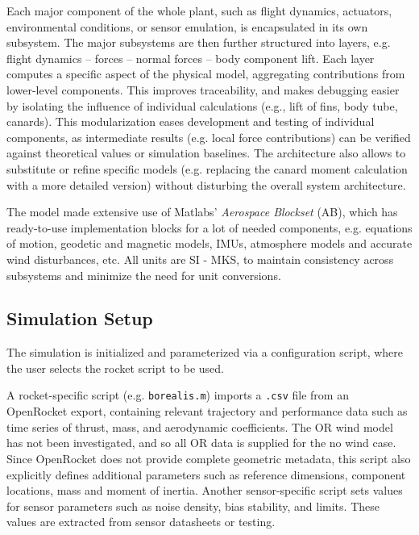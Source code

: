 Each major component of the whole plant, such as flight dynamics, actuators, environmental conditions, or sensor emulation, is encapsulated in its own subsystem. 
The major subsystems are then further structured into layers, e.g. flight dynamics -- forces -- normal forces -- body component lift.
Each layer computes a specific aspect of the physical model,  aggregating contributions from lower-level components. 
This improves traceability, and makes debugging easier by isolating the influence of individual calculations (e.g., lift of fins, body tube, canards).
This modularization eases development and testing of individual components, as intermediate results (e.g. local force contributions) can be verified against theoretical values or simulation baselines. 
The architecture also allows to substitute or refine specific models (e.g. replacing the canard moment calculation with a more detailed version) without disturbing the overall system architecture. 

The model made extensive use of Matlabs' \emph{Aerospace Blockset} (AB), which has ready-to-use implementation blocks for a lot of needed components, e.g. equations of motion, geodetic and magnetic models, IMUs, atmosphere models and accurate wind disturbances, etc.
All units are SI - MKS, to maintain consistency across subsystems and minimize the need for unit conversions. %

\subsection{Simulation Setup}
The simulation is initialized and parameterized via a configuration script, where the user selects the rocket script to be used.  

A rocket-specific script (e.g. \texttt{borealis.m}) imports a \texttt{.csv} file from an OpenRocket export, containing relevant trajectory and performance data such as time series of thrust, mass, and aerodynamic coefficients.
The OR wind model has not been investigated, and so all OR data is supplied for the no wind case.
Since OpenRocket does not provide complete geometric metadata, this script also explicitly defines additional parameters such as reference dimensions, component locations, mass and moment of inertia.
Another sensor-specific script sets values for sensor parameters such as noise density, bias stability, and limits.
These values are extracted from sensor datasheets or testing.

